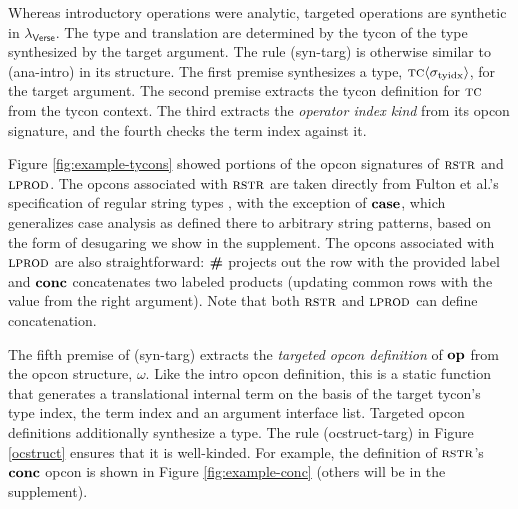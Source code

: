 \documentclass[preprint]{sigplanconf}
\begin{document}
Whereas introductory operations were analytic, targeted operations are synthetic in $\lambda_\textsf{Verse}$. The type and translation are determined by the tycon of the type synthesized by the target argument. The rule (syn-targ) is otherwise similar to (ana-intro) in its structure. The first premise synthesizes a type, ${\textsc{tc}}\langle\sigma_\text{tyidx}\rangle$, for the target argument. The second premise extracts the tycon definition for $\textsc{tc}$ from the tycon context. The third extracts the \emph{operator index kind} from its opcon signature, and the fourth checks the term index against it. 

Figure \ref{fig:example-tycons} showed portions of the opcon signatures of $\textsc{rstr}$ and $\textsc{lprod}$. The opcons associated with $\textsc{rstr}$ are taken directly from Fulton et al.'s specification of regular string types \cite{sanitation-psp14}, with the exception of $\textbf{case}$, which generalizes case analysis as defined there to arbitrary string patterns, based on the form of desugaring we show in the supplement. The opcons associated with $\textsc{lprod}$ are also straightforward: $\textbf{\#}$ projects out the row with the provided label and $\textbf{conc}$ concatenates two labeled products (updating common rows with the value from the right argument). Note that both $\textsc{rstr}$ and $\textsc{lprod}$ can define concatenation. %

The fifth premise of (syn-targ) extracts the \emph{targeted opcon definition} of $\textbf{op}$ from the opcon structure, $\omega$. Like the intro opcon definition, this is a static function that generates a translational internal term on the basis of the target tycon's type index, the term index and an argument interface list. Targeted opcon definitions additionally synthesize a type. The rule (ocstruct-targ) in Figure \ref{ocstruct} ensures that it is well-kinded. For example, the definition of $\textsc{rstr}$'s  $\textbf{conc}$ opcon is shown in Figure \ref{fig:example-conc} (others will be in the supplement).
\end{document}
